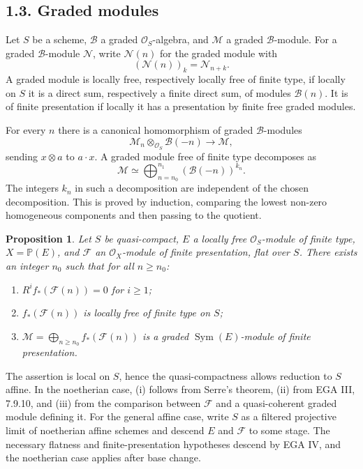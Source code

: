 \documentclass[13pt]{extarticle}
\newcommand{\cO}{\mathcal O}
\newcommand{\Sym}{\operatorname{Sym}}
\newtheorem*{proposition}{Proposition}
\begin{document}
\subsection*{1.3. Graded modules}
Let $S$ be a scheme, $\mathcal B$ a graded $\cO_S$-algebra, and $\mathcal M$ a graded $\mathcal B$-module. For a graded $\mathcal B$-module $\mathcal N$, write $\mathcal N(n)$ for the graded module with
\[
(\mathcal N(n))_k=\mathcal N_{n+k}.
\]
A graded module is locally free, respectively locally free of finite type, if locally on $S$ it is a direct sum, respectively a finite direct sum, of modules $\mathcal B(n)$. It is of finite presentation if locally it has a presentation by finite free graded modules.

For every $n$ there is a canonical homomorphism of graded $\mathcal B$-modules
\begin{equation}\label{eq:VI.1.2.1}
\mathcal M_n\otimes_{\cO_S}\mathcal B(-n)\longrightarrow\mathcal M,
\end{equation}
sending $x\otimes a$ to $a\cdot x$. A graded module free of finite type decomposes as
\begin{equation}\label{eq:VI.1.2.2}
\mathcal M\simeq\bigoplus_{n=n_0}^{n_1}(\mathcal B(-n))^{k_n}.
\end{equation}
The integers $k_n$ in such a decomposition are independent of the chosen decomposition. This is proved by induction, comparing the lowest non-zero homogeneous components and then passing to the quotient.

\begin{proposition}\label{prop:VI.1.3}
Let $S$ be quasi-compact, $E$ a locally free $\cO_S$-module of finite type, $X=\mathbb P(E)$, and $\mathcal F$ an $\cO_X$-module of finite presentation, flat over $S$. There exists an integer $n_0$ such that for all $n\geq n_0$:
\begin{enumerate}[label=(\roman*)]
\item $R^if_*(\mathcal F(n))=0$ for $i\geq 1$;
\item $f_*(\mathcal F(n))$ is locally free of finite type on $S$;
\item $\mathcal M=\bigoplus_{n\geq n_0}f_*(\mathcal F(n))$ is a graded $\Sym(E)$-module of finite presentation.
\end{enumerate}
\end{proposition}

The assertion is local on $S$, hence the quasi-compactness allows reduction to $S$ affine. In the noetherian case, (i) follows from Serre's theorem, (ii) from EGA III, 7.9.10, and (iii) from the comparison between $\mathcal F$ and a quasi-coherent graded module defining it. For the general affine case, write $S$ as a filtered projective limit of noetherian affine schemes and descend $E$ and $\mathcal F$ to some stage. The necessary flatness and finite-presentation hypotheses descend by EGA IV, and the noetherian case applies after base change.
\end{document}
